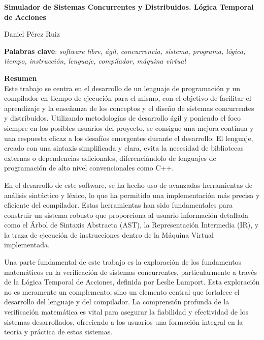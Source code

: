 \thispagestyle{empty}

\begin{center}
{\large\bfseries Simulador de Sistemas Concurrentes y Distribuidos. Lógica Temporal de Acciones }\\
\end{center}
\begin{center}
Daniel Pérez Ruiz\\
\end{center}


\vspace{0.5cm}
\noindent\textbf{Palabras clave}: \textit{software libre, ágil, concurrencia, sistema, programa, lógica, tiempo, instrucción, lenguaje, compilador, máquina virtual}
\vspace{0.7cm}

\noindent\textbf{Resumen}\\
Este trabajo se centra en el desarrollo de un lenguaje de programación y un compilador en tiempo de ejecución para el mismo, con el objetivo de facilitar el aprendizaje y la enseñanza de los conceptos y el diseño de sistemas concurrentes y distribuidos. Utilizando metodologías de desarrollo ágil y poniendo el foco siempre en los posibles usuarios del proyecto, se consigue una mejora continua y una respuesta eficaz a los desafíos emergentes durante el desarrollo. El lenguaje, creado con una sintaxis simplificada y clara, evita la necesidad de bibliotecas externas o dependencias adicionales, diferenciándolo de lenguajes de programación de alto nivel convencionales como C++.

En el desarrollo de este software, se ha hecho uso de avanzadas herramientas de análisis sintáctico y léxico, lo que ha permitido una implementación más precisa y eficiente del compilador. Estas herramientas han sido fundamentales para construir un sistema robusto que proporciona al usuario información detallada como el Árbol de Sintaxis Abstracta (AST), la Representación Intermedia (IR), y la traza de ejecución de instrucciones dentro de la Máquina Virtual implementada.

Una parte fundamental de este trabajo es la exploración de los fundamentos matemáticos en la verificación de sistemas concurrentes, particularmente a través de la Lógica Temporal de Acciones, definida por Leslie Lamport. Esta exploración no es meramente un complemento, sino un elemento central que fortalece el desarrollo del lenguaje y del compilador. La comprensión profunda de la verificación matemática es vital para asegurar la fiabilidad y efectividad de los sistemas desarrollados, ofreciendo a los usuarios una formación integral en la teoría y práctica de estos sistemas.

